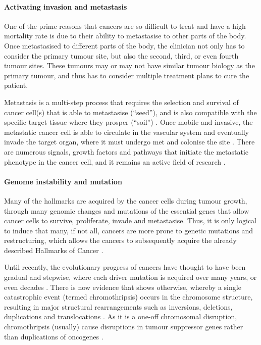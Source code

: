 \paragraph{Activating invasion and metastasis}

\noindent
One of the prime reasons that cancers are so difficult to treat and have a high mortality rate is due to their ability to metastasise to other parts of the body.
Once metastasised to different parts of the body, the clinician not only has to consider the primary tumour site, but also the second, third, or even fourth tumour sites.
These tumours may or may not have similar tumour biology as the primary tumour, and thus has to consider multiple treatment plans to cure the patient.

Metastasis is a multi-step process that requires the selection and survival of cancer cell(s) that is able to metastasise (``seed''), and is also compatible with the specific target tissue where they prosper (``soil'') \citep{Talmadge2010}.
Once mobile and invasive, the metastatic cancer cell is able to circulate in the vascular system and eventually invade the target organ, where it must undergo \gls{met} and colonise the site \citep{Hanahan2011,Kalluri2009}.
There are numerous signals, growth factors and pathways that initiate the metastatic phenotype in the cancer cell, and it remains an active field of research \citep{Hanahan2011,Kalluri2009}.

\paragraph{Genome instability and mutation}

\noindent
Many of the hallmarks are acquired by the cancer cells during tumour growth, through many genomic changes and mutations of the essential genes that allow cancer cells to survive, proliferate, invade and metastasise.
Thus, it is only logical to induce that many, if not all, cancers are more prone to genetic mutations and restructuring, which allows the cancers to subsequently acquire the already described Hallmarks of Cancer \citep{Hanahan2011}.

Until recently, the evolutionary progress of cancers have thought to have been gradual and stepwise, where each driver mutation is acquired over many years, or even decades \citep{Stephens2011}.
There is now evidence that shows otherwise, whereby a single catastrophic event (termed \gls{chromothripsis}) occurs in the chromosome structure, resulting in major structural rearrangements such as inversions, deletions, duplications and translocations \citep{Leibowitz2015,Stephens2011}.
As it is a one-off chromosomal disruption, \gls{chromothripsis} (usually) cause disruptions in tumour suppressor genes rather than duplications of oncogenes \citep{Leibowitz2015}.


